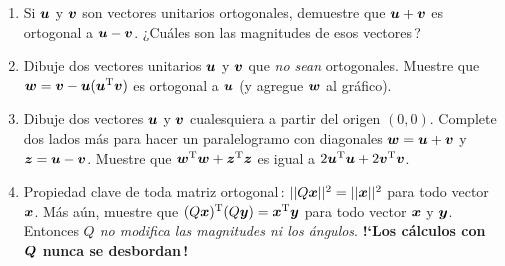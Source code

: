 \documentclass[12pt,a4paper]{article}
\newcommand{\bi}[1]{\hbox{\boldmath$#1$}}
\newcommand\1{\mbox{\,\vrule height-0.8pt depth1.0pt width2pc\,}}
\newcommand\2{\mbox{\,\vrule height-0.8pt depth1.0pt width1pc\,}}
\DeclareRobustCommand\transp{^{\mathrm{T}}}
\newcommand{\bu}{\hbox{\boldmath$u$}}
\newcommand{\bv}{\hbox{\boldmath$v$}}
\newcommand{\bw}{\hbox{\boldmath$w$}}
\begin{document}
\begin{enumerate}
\item Si $\bu$ y $\bv$ son vectores unitarios ortogonales, demuestre que $\bu+\bv$ es ortogonal a $\bu-\bv$.\linebreak\vspace{-5pt}
¿Cuáles son las magnitudes de esos vectores\,?

\item Dibuje dos vectores unitarios $\bu$ y $\bv$ que \emph{no sean} ortogonales. Muestre que $\bw=\bv-\bu(\bu\transp\bv)$ es ortogonal a $\bu$ (y agregue $\bw$ al gráfico).

\item Dibuje dos vectores $\bu$ y $\bv$ cualesquiera a partir del origen $(0,0)$. Complete dos lados más para hacer un paralelogramo con diagonales $\bw=\bu+\bv$ y $\bi{z}=\bu-\bv$. Muestre que $\bw\transp\bw+\bi{z}\transp\bi{z}$ es igual a $2\bu\transp\bu+2\bv\transp\bv$.

\item Propiedad clave de toda matriz ortogonal\,: $||Q\bi{x}||^2=||\bi{x}||^2$ para todo vector $\bi{x}$. Más aún, muestre que $(Q\bi{x})\transp(Q\bi{y})=\bi{x}\transp\bi{y}$ para todo vector $\bi{x}$ y $\bi{y}$. Entonces \emph{$Q$ no modifica las magnitudes ni los ángulos}. \textbf{!`Los cálculos con $\bi{Q}$ nunca se desbordan\,!} %


\end{enumerate}
\end{document}

